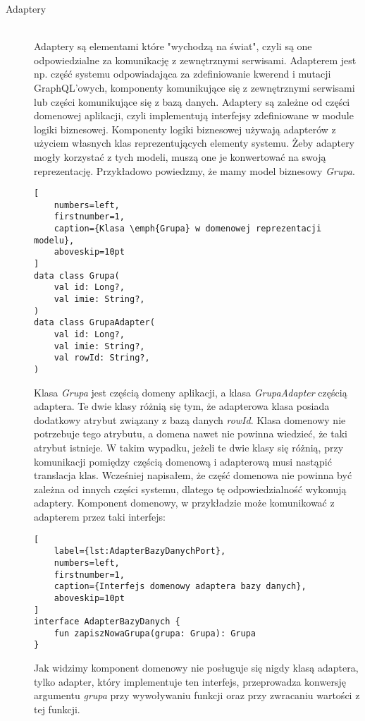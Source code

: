 \begin{description}
\item[Adaptery] \hfill \\ Adaptery są elementami które "wychodzą na świat", czyli są one odpowiedzialne za komunikację z zewnętrznymi serwisami. Adapterem jest np. część systemu odpowiadająca za zdefiniowanie kwerend i mutacji GraphQL'owych, komponenty komunikujące się z zewnętrznymi serwisami lub części komunikujące się z bazą danych. Adaptery są zależne od części domenowej aplikacji, czyli implementują interfejsy zdefiniowane w module logiki biznesowej. Komponenty logiki biznesowej używają adapterów z użyciem własnych klas reprezentujących elementy systemu. Żeby adaptery mogły korzystać z tych modeli, muszą one je konwertować na swoją reprezentację. Przykładowo powiedzmy, że mamy model biznesowy \emph{Grupa}.

\begin{addmargin}[6mm]{0mm}
\begin{lstlisting}[
    numbers=left,
    firstnumber=1,
    caption={Klasa \emph{Grupa} w domenowej reprezentacji modelu},
    aboveskip=10pt
]
data class Grupa(
    val id: Long?,
    val imie: String?,
)
data class GrupaAdapter(
    val id: Long?,
    val imie: String?,
    val rowId: String?,
)
\end{lstlisting}
\end{addmargin}

Klasa \emph{Grupa} jest częścią domeny aplikacji, a klasa \emph{GrupaAdapter} częścią adaptera. Te dwie klasy różnią się tym, że adapterowa klasa posiada dodatkowy atrybut związany z bazą danych \emph{rowId}. Klasa domenowy nie potrzebuje tego atrybutu, a domena nawet nie powinna wiedzieć, że taki atrybut istnieje. W takim wypadku, jeżeli te dwie klasy się różnią, przy komunikacji pomiędzy częścią domenową i adapterową musi nastąpić translacja klas. Wcześniej napisałem, że część domenowa nie powinna być zależna od innych części systemu, dlatego tę odpowiedzialność wykonują adaptery. Komponent domenowy, w przykładzie może komunikować z adapterem przez taki interfejs:
\begin{addmargin}[6mm]{0mm}
\begin{lstlisting}[
    label={lst:AdapterBazyDanychPort},
    numbers=left,
    firstnumber=1,
    caption={Interfejs domenowy adaptera bazy danych},
    aboveskip=10pt
]
interface AdapterBazyDanych {
    fun zapiszNowaGrupa(grupa: Grupa): Grupa
}
\end{lstlisting}
\end{addmargin}
Jak widzimy komponent domenowy nie posługuje się nigdy klasą adaptera, tylko adapter, który implementuje ten interfejs, przeprowadza konwersję argumentu \emph{grupa} przy wywoływaniu funkcji oraz przy zwracaniu wartości z tej funkcji.


\end{description}
